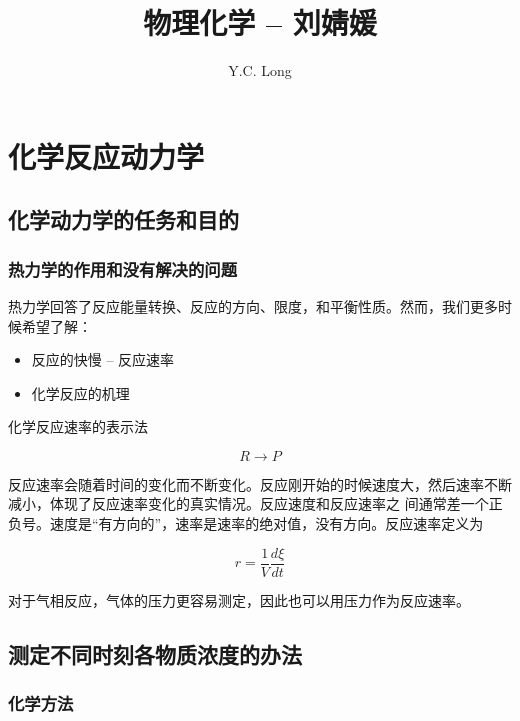 \documentclass[a4paper]{ctexrep}
\author{Y.C. Long}
\title{物理化学 -- 刘婧媛}
\begin{document}
    \maketitle
    \tableofcontents

    
    
    
    \chapter{化学反应动力学}

    \section{化学动力学的任务和目的}

    \subsection{热力学的作用和没有解决的问题}

    热力学回答了反应能量转换、反应的方向、限度，和平衡性质。然而，我们更多时候希望了解：

    \begin{itemize}
      \item 反应的快慢 -- 反应速率
      \item 化学反应的机理
    \end{itemize}

    化学反应速率的表示法

    \[
       R \rightarrow P
    \]

    反应速率会随着时间的变化而不断变化。反应刚开始的时候速度大，然后速率不断减小，体现了反应速率变化的真实情况。反应速度和反应速率之 间通常差一个正负号。速度是``有方向的''，速率是速率的绝对值，没有方向。反应速率定义为

    \[
      r = \frac{1}{V} \frac{d \xi}{dt}
    \]

    对于气相反应，气体的压力更容易测定，因此也可以用压力作为反应速率。

    \section{测定不同时刻各物质浓度的办法}

    \subsection{化学方法}
\end{document}
